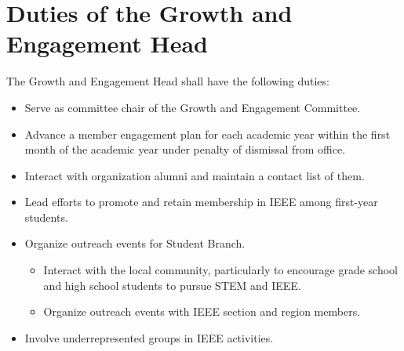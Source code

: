 \documentclass[12pt]{constitution}
\begin{document}
\section{Duties of the Growth and Engagement Head}
\label{sec:officer_growth}
The Growth and Engagement Head shall have the following duties:
\begin{itemize}
    \item Serve as committee chair of the Growth and Engagement Committee.
    \item Advance a member engagement plan for each academic year within the first month of the academic year under penalty of dismissal from office.
    \item Interact with organization alumni and maintain a contact list of them.
    \item Lead efforts to promote and retain membership in IEEE among first-year students.
    \item Organize outreach events for Student Branch.
    \begin{itemize}
        \item Interact with the local community, particularly to encourage grade school and high school students to pursue STEM and IEEE.
        \item Organize outreach events with IEEE section and region members.
    \end{itemize}
    \item Involve underrepresented groups in IEEE activities.
\end{itemize}
\end{document}
